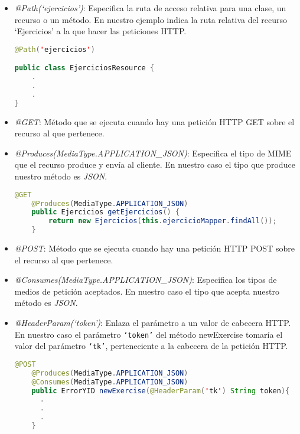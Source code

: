 \begin{itemize}


\item \textit{@Path(`ejercicios')}: Especifica la ruta de acceso relativa para una clase, un recurso o un método. En nuestro ejemplo indica la ruta relativa del recurso `Ejercicios' a la que hacer las peticiones HTTP.

\vspace{1em}
{\codesize
\lstset{}
\begin{lstlisting}[frame=single, language=java]
@Path('ejercicios')

public class EjerciciosResource {
	.
	.
	.
}
\end{lstlisting}
}
\vspace{1em}


\item \textit{@GET}: Método que se ejecuta cuando hay una petición HTTP GET sobre el recurso al que pertenece.

\item \textit{@Produces(MediaType.APPLICATION\_JSON)}: Especifica el tipo de MIME que el recurso produce y envía al cliente. En nuestro caso el tipo que produce nuestro método es \textit{JSON}.

\vspace{1em}
{\codesize
\lstset{}
\begin{lstlisting}[frame=single, language=java]
    @GET
    @Produces(MediaType.APPLICATION_JSON)
    public Ejercicios getEjercicios() {
        return new Ejercicios(this.ejercicioMapper.findAll());
    }
\end{lstlisting}
}
\vspace{1em}


\item \textit{@POST}: Método que se ejecuta cuando hay una petición HTTP POST sobre el recurso al que pertenece.

\item \textit{@Consumes(MediaType.APPLICATION\_JSON)}: Especifica los tipos de medios de petición aceptados. En nuestro caso el tipo que acepta nuestro método es \textit{JSON}.

\item \textit{@HeaderParam(`token')}: Enlaza el parámetro a un valor de cabecera HTTP. En nuestro caso el parámetro \texttt{`token'} del método newExercise tomaría el valor del parámetro \texttt{`tk'}, perteneciente a la cabecera de la petición HTTP.



\vspace{1em}
{\codesize
\lstset{}
\begin{lstlisting}[frame=single, language=java]
    @POST
    @Produces(MediaType.APPLICATION_JSON)
    @Consumes(MediaType.APPLICATION_JSON)
    public ErrorYID newExercise(@HeaderParam('tk') String token){
      .
      .
      .
    }
\end{lstlisting}
}
\vspace{1em}



\end{itemize}
